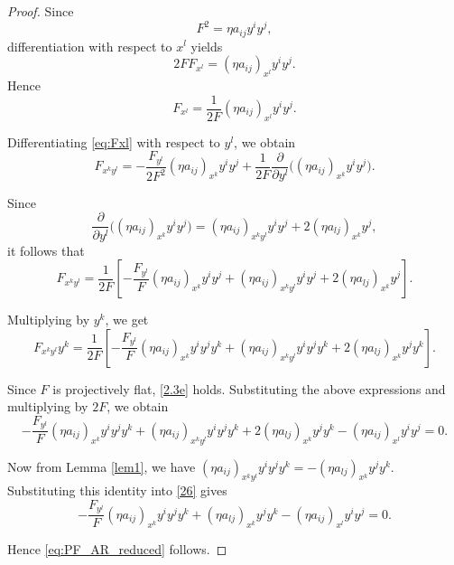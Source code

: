 \documentclass[12pt]{article}
\theoremstyle{definition}
\begin{document}
								\begin{proof}
									Since
									\[
									F^2=\eta a_{ij}y^iy^j,
									\]
									differentiation with respect to \(x^l\) yields
									\[
									2FF_{x^l}
									=
									(\eta a_{ij})_{x^l}y^iy^j.
									\]
									Hence
									\begin{equation}
									F_{x^l}
									=
									\frac{1}{2F}
									(\eta a_{ij})_{x^l}y^iy^j.
									\label{eq:Fxl}
									\end{equation}
									
									Differentiating \eqref{eq:Fxl} with respect to \(y^l\), we obtain
									\[
									F_{x^ky^l}
									=
									-\frac{F_{y^l}}{2F^2}
									(\eta a_{ij})_{x^k}y^iy^j
									+\frac{1}{2F}
									\frac{\partial}{\partial y^l}
									\Big(
									(\eta a_{ij})_{x^k}y^iy^j
									\Big).
									\]
									
									Since
									\[
									\frac{\partial}{\partial y^l}
									\Big(
									(\eta a_{ij})_{x^k}y^iy^j
									\Big)
									=
									(\eta a_{ij})_{x^ky^l}y^iy^j
									+
									2(\eta a_{lj})_{x^k}y^j,
									\]
									it follows that
									\[
									F_{x^ky^l}
									=
									\frac{1}{2F}
									\left[
									-\frac{F_{y^l}}{F}
									(\eta a_{ij})_{x^k}y^iy^j
									+
									(\eta a_{ij})_{x^ky^l}y^iy^j
									+
									2(\eta a_{lj})_{x^k}y^j
									\right].
									\]
									
									Multiplying by \(y^k\), we get
									\[
									F_{x^ky^l}y^k
									=
									\frac{1}{2F}
									\left[
									-\frac{F_{y^l}}{F}
									(\eta a_{ij})_{x^k}y^iy^jy^k
									+
									(\eta a_{ij})_{x^ky^l}y^iy^jy^k
									+
									2(\eta a_{lj})_{x^k}y^jy^k
									\right].
									\]
									
									Since \(F\) is projectively flat, \eqref{2.3e}
									holds. Substituting the above expressions and multiplying by \(2F\), we obtain
									\begin{equation}\label{26}
									-\frac{F_{y^l}}{F}
									(\eta a_{ij})_{x^k}y^iy^jy^k
									+
									(\eta a_{ij})_{x^ky^l}y^iy^jy^k
									+
									2(\eta a_{lj})_{x^k}y^jy^k
									-
									(\eta a_{ij})_{x^l}y^iy^j
									=0.   
									\end{equation}
									
									Now from Lemma \ref{lem1}, we have
									$(\eta a_{ij})_{x^ky^l}y^iy^jy^k
									=
									-(\eta a_{lj})_{x^k}y^jy^k.$
									Substituting this identity into \eqref{26} gives
									\[
									-\frac{F_{y^l}}{F}
									(\eta a_{ij})_{x^k}y^iy^jy^k
									+
									(\eta a_{lj})_{x^k}y^jy^k
									-
									(\eta a_{ij})_{x^l}y^iy^j
									=0.
									\]
									
									Hence \eqref{eq:PF_AR_reduced} follows.
								\end{proof}
								
\end{document}
